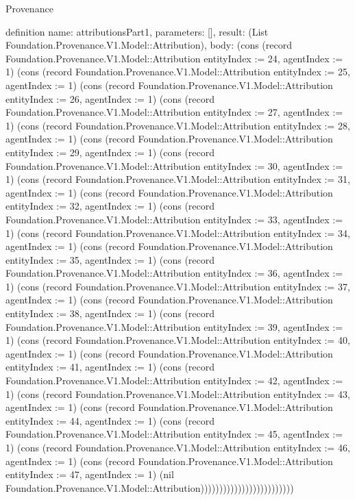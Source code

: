 \begin{lexlean}{Provenance}
\begin{semanticmodule}
definition{
  name: attributionsPart1,
  parameters: [],
  result: (List Foundation.Provenance.V1.Model::Attribution),
  body: (cons (record Foundation.Provenance.V1.Model::Attribution {entityIndex := 24, agentIndex := 1}) (cons (record Foundation.Provenance.V1.Model::Attribution {entityIndex := 25, agentIndex := 1}) (cons (record Foundation.Provenance.V1.Model::Attribution {entityIndex := 26, agentIndex := 1}) (cons (record Foundation.Provenance.V1.Model::Attribution {entityIndex := 27, agentIndex := 1}) (cons (record Foundation.Provenance.V1.Model::Attribution {entityIndex := 28, agentIndex := 1}) (cons (record Foundation.Provenance.V1.Model::Attribution {entityIndex := 29, agentIndex := 1}) (cons (record Foundation.Provenance.V1.Model::Attribution {entityIndex := 30, agentIndex := 1}) (cons (record Foundation.Provenance.V1.Model::Attribution {entityIndex := 31, agentIndex := 1}) (cons (record Foundation.Provenance.V1.Model::Attribution {entityIndex := 32, agentIndex := 1}) (cons (record Foundation.Provenance.V1.Model::Attribution {entityIndex := 33, agentIndex := 1}) (cons (record Foundation.Provenance.V1.Model::Attribution {entityIndex := 34, agentIndex := 1}) (cons (record Foundation.Provenance.V1.Model::Attribution {entityIndex := 35, agentIndex := 1}) (cons (record Foundation.Provenance.V1.Model::Attribution {entityIndex := 36, agentIndex := 1}) (cons (record Foundation.Provenance.V1.Model::Attribution {entityIndex := 37, agentIndex := 1}) (cons (record Foundation.Provenance.V1.Model::Attribution {entityIndex := 38, agentIndex := 1}) (cons (record Foundation.Provenance.V1.Model::Attribution {entityIndex := 39, agentIndex := 1}) (cons (record Foundation.Provenance.V1.Model::Attribution {entityIndex := 40, agentIndex := 1}) (cons (record Foundation.Provenance.V1.Model::Attribution {entityIndex := 41, agentIndex := 1}) (cons (record Foundation.Provenance.V1.Model::Attribution {entityIndex := 42, agentIndex := 1}) (cons (record Foundation.Provenance.V1.Model::Attribution {entityIndex := 43, agentIndex := 1}) (cons (record Foundation.Provenance.V1.Model::Attribution {entityIndex := 44, agentIndex := 1}) (cons (record Foundation.Provenance.V1.Model::Attribution {entityIndex := 45, agentIndex := 1}) (cons (record Foundation.Provenance.V1.Model::Attribution {entityIndex := 46, agentIndex := 1}) (cons (record Foundation.Provenance.V1.Model::Attribution {entityIndex := 47, agentIndex := 1}) (nil Foundation.Provenance.V1.Model::Attribution)))))))))))))))))))))))))
}


\end{semanticmodule}
\end{lexlean}
